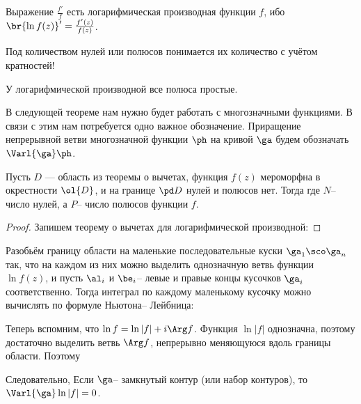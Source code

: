 \documentclass[a4paper]{article}
\begin{document}
\begin{note}
Выражение $\frac{f'}{f}$ есть логарифмическая производная функции $f$, ибо $\br{\ln f(z)}' = \frac{f'(z)}{f(z)}$.
\end{note}

\begin{note}
Под количеством нулей или полюсов понимается их количество с учётом кратностей!
\end{note}

\begin{note}
У логарифмической производной все полюса простые.
\end{note}

В следующей теореме нам нужно будет работать с многозначными функциями. В связи с этим нам потребуется одно важное
обозначение. Приращение непрерывной ветви многозначной функции $\ph$ на кривой $\ga$ будем обозначать $\Varl{\ga}\ph$.

\begin{theorem}
Пусть $D$ --- область из теоремы о вычетах, функция $f(z)$ мероморфна в окрестности $\ol{D}$, и на границе
$\pd D$ нулей и полюсов нет. Тогда
где $N$-- число нулей, а $P$-- число полюсов функции $f$.
\end{theorem}
\begin{proof}
Запишем теорему о вычетах для логарифмической производной:
\hfill\end{proof}

Разобьём границу области на маленькие последовательные
куски $\ga_1 \sco \ga_n$ так, что
на каждом из них можно выделить однозначную ветвь функции $\ln f(z)$, и пусть $\al_i$ и $\be_i$--
левые и правые концы кусочков $\ga_i$ соответственно. Тогда интеграл по каждому маленькому кусочку
можно вычислять по формуле Ньютона-- Лейбница:

Теперь вспомним, что $\ln f = \ln |f| + i \Arg f$. Функция $\ln |f|$ однозначна, поэтому достаточно выделить
ветвь $\Arg f$, непрерывно меняющуюся вдоль границы области. Поэтому

Следовательно,
Если $\ga$-- замкнутый контур (или набор контуров), то $\Varl{\ga}\ln|f|=0$.
\end{document}
